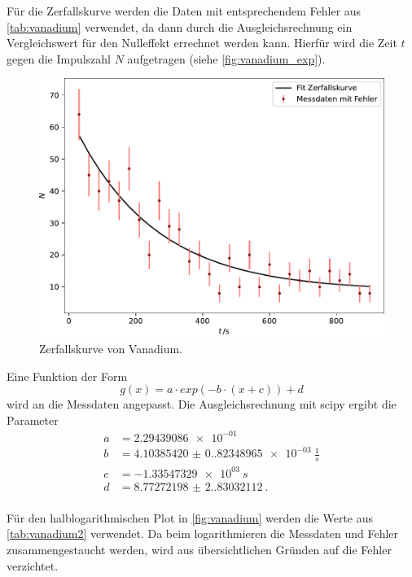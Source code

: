 Für die Zerfallskurve werden die Daten mit entsprechendem Fehler aus \autoref{tab:vanadium} verwendet, da dann durch die Ausgleichsrechnung ein Vergleichswert für den Nulleffekt
errechnet werden kann. Hierfür wird die Zeit $t$ gegen die Impulszahl $N$ aufgetragen (siehe \autoref{fig:vanadium_exp}).
\begin{figure}[H]
  \includegraphics[width=\linewidth]{plots/vanadium_exp.pdf}
  \caption{Zerfallskurve von Vanadium.}
  \label{fig:vanadium_exp}
\end{figure}
Eine Funktion der Form 
\begin{equation*}
  g(x) = a\cdot exp(-b\cdot(x+c)) + d
\end{equation*}
wird an die Messdaten angepasst. Die Ausgleichsrechnung mit scipy \cite{scipy} ergibt die Parameter
\begin{align*}
  a &= \SI{2.29439086e-01}{}\\
  b &= \SI{4.10385420(0.82348965)e-03}{\frac{1}{s}}\\
  c &= \SI{-1.33547329e+03}{s}\\
  d &= \SI{8.77272198(2.83032112)}{}.\\
\end{align*}

Für den halblogarithmischen Plot in \autoref{fig:vanadium} werden die Werte aus \autoref{tab:vanadium2} verwendet. Da beim logarithmieren die Messdaten und Fehler zusammengestaucht werden,
wird aus übersichtlichen Gründen auf die Fehler verzichtet. 

